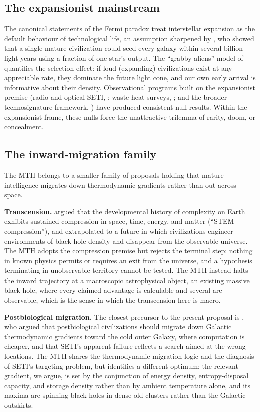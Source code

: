\documentclass[11pt]{article}
\begin{document}
\subsection{The expansionist mainstream}

The canonical statements of the Fermi paradox \citep{Hart1975,Tipler1980} treat interstellar expansion as the default behaviour of technological life, an assumption sharpened by \citet{Armstrong2013}, who showed that a single mature civilization could seed every galaxy within several billion light-years using a fraction of one star's output. The ``grabby aliens'' model of \citet{Hanson2021} quantifies the selection effect: if loud (expanding) civilizations exist at any appreciable rate, they dominate the future light cone, and our own early arrival is informative about their density. Observational programs built on the expansionist premise (radio and optical SETI, \citealt{Tarter2001}; waste-heat surveys, \citealt{Dyson1960,Wright2014,Griffith2015}; and the broader technosignature framework, \citealt{Wright2022,SocasNavarro2021,Lingam2021}) have produced consistent null results. Within the expansionist frame, these nulls force the unattractive trilemma of rarity, doom, or concealment.

\subsection{The inward-migration family}

The MTH belongs to a smaller family of proposals holding that mature intelligence migrates down thermodynamic gradients rather than out across space.

\textbf{Transcension.} \citet{Smart2012} argued that the developmental history of complexity on Earth exhibits sustained compression in space, time, energy, and matter (``STEM compression''), and extrapolated to a future in which civilizations engineer environments of black-hole density and disappear from the observable universe. The MTH adopts the compression premise but rejects the terminal step: nothing in known physics permits or requires an exit from the universe, and a hypothesis terminating in unobservable territory cannot be tested. The MTH instead halts the inward trajectory at a macroscopic astrophysical object, an existing massive black hole, where every claimed advantage is calculable and several are observable, which is the sense in which the transcension here is macro.

\textbf{Postbiological migration.} The closest precursor to the present proposal is \citet{CirkovicBradbury2006}, who argued that postbiological civilizations should migrate down Galactic thermodynamic gradients toward the cold outer Galaxy, where computation is cheaper, and that SETI's apparent failure reflects a search aimed at the wrong locations. The MTH shares the thermodynamic-migration logic and the diagnosis of SETI's targeting problem, but identifies a different optimum: the relevant gradient, we argue, is set by the conjunction of energy density, entropy-disposal capacity, and storage density rather than by ambient temperature alone, and its maxima are spinning black holes in dense old clusters rather than the Galactic outskirts.
\end{document}
